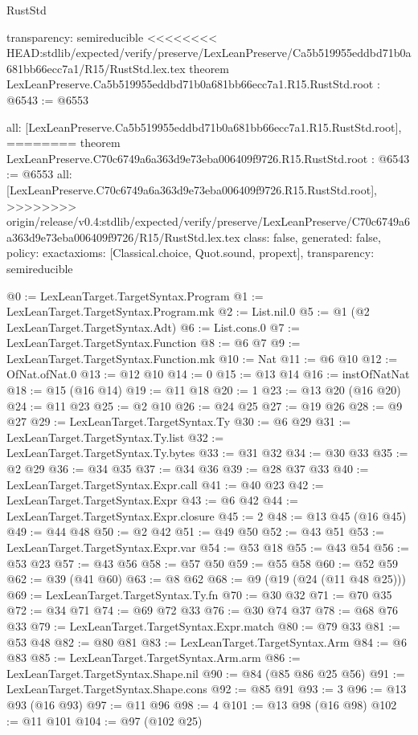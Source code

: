 \begin{lexlean}{RustStd}
\begin{coremodule}
{\begin{coremodule}
{{{{{{{{{{{{{{  transparency: semireducible
}
<<<<<<<< HEAD:stdlib/expected/verify/preserve/LexLeanPreserve/Ca5b519955eddbd71b0a681bb66ecc7a1/R15/RustStd.lex.tex
theorem LexLeanPreserve.Ca5b519955eddbd71b0a681bb66ecc7a1.R15.RustStd.root : @6543 := @6553 {
  all: [LexLeanPreserve.Ca5b519955eddbd71b0a681bb66ecc7a1.R15.RustStd.root],
========
theorem LexLeanPreserve.C70c6749a6a363d9e73eba006409f9726.R15.RustStd.root : @6543 := @6553 {
  all: [LexLeanPreserve.C70c6749a6a363d9e73eba006409f9726.R15.RustStd.root],
>>>>>>>> origin/release/v0.4:stdlib/expected/verify/preserve/LexLeanPreserve/C70c6749a6a363d9e73eba006409f9726/R15/RustStd.lex.tex
  class: false,
  generated: false,
  policy: exact{axioms: [Classical.choice, Quot.sound, propext]},
  transparency: semireducible
}

@0 := LexLeanTarget.TargetSyntax.Program
@1 := LexLeanTarget.TargetSyntax.Program.mk
@2 := List.nil.{0}
@5 := @1 (@2 LexLeanTarget.TargetSyntax.Adt)
@6 := List.cons.{0}
@7 := LexLeanTarget.TargetSyntax.Function
@8 := @6 @7
@9 := LexLeanTarget.TargetSyntax.Function.mk
@10 := Nat
@11 := @6 @10
@12 := OfNat.ofNat.{0}
@13 := @12 @10
@14 := 0
@15 := @13 @14
@16 := instOfNatNat
@18 := @15 (@16 @14)
@19 := @11 @18
@20 := 1
@23 := @13 @20 (@16 @20)
@24 := @11 @23
@25 := @2 @10
@26 := @24 @25
@27 := @19 @26
@28 := @9 @27
@29 := LexLeanTarget.TargetSyntax.Ty
@30 := @6 @29
@31 := LexLeanTarget.TargetSyntax.Ty.list
@32 := LexLeanTarget.TargetSyntax.Ty.bytes
@33 := @31 @32
@34 := @30 @33
@35 := @2 @29
@36 := @34 @35
@37 := @34 @36
@39 := @28 @37 @33
@40 := LexLeanTarget.TargetSyntax.Expr.call
@41 := @40 @23
@42 := LexLeanTarget.TargetSyntax.Expr
@43 := @6 @42
@44 := LexLeanTarget.TargetSyntax.Expr.closure
@45 := 2
@48 := @13 @45 (@16 @45)
@49 := @44 @48
@50 := @2 @42
@51 := @49 @50
@52 := @43 @51
@53 := LexLeanTarget.TargetSyntax.Expr.var
@54 := @53 @18
@55 := @43 @54
@56 := @53 @23
@57 := @43 @56
@58 := @57 @50
@59 := @55 @58
@60 := @52 @59
@62 := @39 (@41 @60)
@63 := @8 @62
@68 := @9 (@19 (@24 (@11 @48 @25)))
@69 := LexLeanTarget.TargetSyntax.Ty.fn
@70 := @30 @32
@71 := @70 @35
@72 := @34 @71
@74 := @69 @72 @33
@76 := @30 @74 @37
@78 := @68 @76 @33
@79 := LexLeanTarget.TargetSyntax.Expr.match
@80 := @79 @33
@81 := @53 @48
@82 := @80 @81
@83 := LexLeanTarget.TargetSyntax.Arm
@84 := @6 @83
@85 := LexLeanTarget.TargetSyntax.Arm.arm
@86 := LexLeanTarget.TargetSyntax.Shape.nil
@90 := @84 (@85 @86 @25 @56)
@91 := LexLeanTarget.TargetSyntax.Shape.cons
@92 := @85 @91
@93 := 3
@96 := @13 @93 (@16 @93)
@97 := @11 @96
@98 := 4
@101 := @13 @98 (@16 @98)
@102 := @11 @101
@104 := @97 (@102 @25)
}}}}}}}}}}}}}}
\end{coremodule}}
\end{coremodule}
\end{lexlean}
